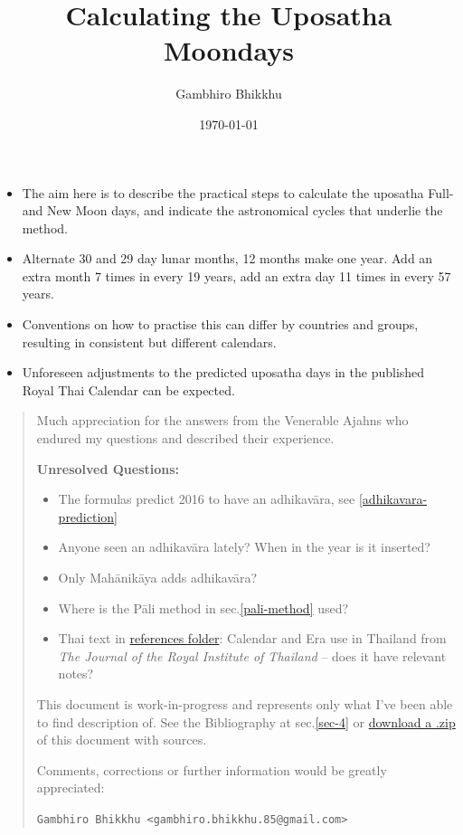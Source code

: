 \documentclass[11pt,oneside]{memoir-article}
\author{Gambhiro Bhikkhu}
\date{\today}
\title{Calculating the Uposatha Moondays}
\begin{document}
\maketitle
\begin{tldr}
\begin{itemize}
\item The aim here is to describe the practical steps to calculate the
uposatha Full- and New Moon days, and indicate the astronomical
cycles that underlie the method.
\item Alternate 30 and 29 day lunar months, 12 months make one year. Add
an extra month 7 times in every 19 years, add an extra day 11 times
in every 57 years.
\item Conventions on how to practise this can differ by countries and
groups, resulting in consistent but different calendars.
\item Unforeseen adjustments to the predicted uposatha days in the
published Royal Thai Calendar can be expected.
\end{itemize}
\end{tldr}

\begin{quote}
Much appreciation for the answers from the Venerable Ajahns who
endured my questions and described their experience.

\textbf{Unresolved Questions:}

\begin{itemize}
\item The formulas predict 2016 to have an adhikavāra, see \ref{adhikavara-prediction}
\item Anyone seen an adhikavāra lately? When in the year is it inserted?
\item Only Mahānikāya adds adhikavāra?
\item Where is the Pāli method in sec.\ref{pali-method} used?
\item Thai text in \href{https://github.com/profound-labs/calculating-the-uposatha-moondays/tree/master/references}{references folder}: Calendar and Era use in Thailand
from \emph{The Journal of the Royal Institute of Thailand} -- does it
have relevant notes?
\end{itemize}

This document is work-in-progress and represents only what I've been
able to find description of. See the Bibliography at sec.\ref{sec-4}
or \href{https://github.com/profound-labs/calculating-the-uposatha-moondays/archive/master.zip}{download a .zip} of this document with sources.

Comments, corrections or further information would be greatly
appreciated:

\texttt{Gambhiro Bhikkhu <gambhiro.bhikkhu.85@gmail.com>}
\end{quote}
\end{document}
